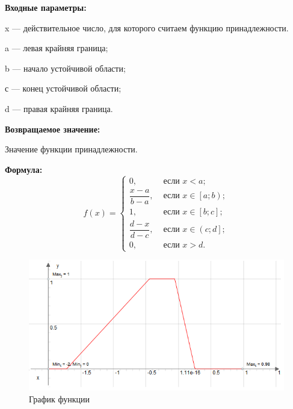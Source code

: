 \textbf{Входные параметры:}
  
x --- действительное число, для которого считаем функцию принадлежности.
 
a --- левая крайняя граница;
 
b --- начало устойчивой области;
 
с --- конец устойчивой области;
 
d --- правая крайняя граница.

\textbf{Возвращаемое значение:}
 
Значение функции принадлежности.

\textbf{Формула:}
\begin{equation*}
f\left(x \right)=\left\lbrace \begin{aligned}  0,& \text{ если } x < a   ; \\\dfrac{x-a}{b-a},& \text{ если } x \in \left[ a; b\right)   ; \\1,& \text{ если } x \in \left[ b; c\right] ; \\\dfrac{d-x}{d-c},& \text{ если } x \in \left( c; d\right]   ; \\ 0,& \text{ если } x >d. \end{aligned}\right.
\end{equation*}

 \begin{figure} [h] 
   \center
   \includegraphics {HML_TrapeziformFuzzyNumber_Graph.png}
   \caption{График функции} 
   \label{img:HML_TrapeziformFuzzyNumber_Graph}  
 \end{figure}

